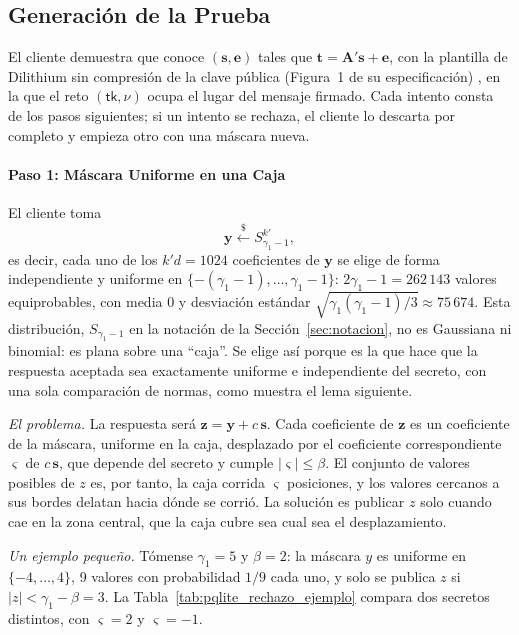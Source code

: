 \subsection{Generación de la Prueba}
\label{sec:pqlite-prueba}

El cliente demuestra que conoce $(\mathbf{s}, \mathbf{e})$ tales que $\mathbf{t} = \mathbf{A}'\mathbf{s} + \mathbf{e}$, con la plantilla de Dilithium sin compresión de la clave pública (Figura~1 de su especificación) \cite{ducas2018crystals, bai2021dilithium}, en la que el reto $(\mathsf{tk}, \nu)$ ocupa el lugar del mensaje firmado. Cada intento consta de los pasos siguientes; si un intento se rechaza, el cliente lo descarta por completo y empieza otro con una máscara nueva.

\paragraph{Paso 1: Máscara Uniforme en una Caja}
\label{sec:pqlite-mascara}
El cliente toma
\begin{equation}
\mathbf{y} \xleftarrow{\$} S_{\gamma_1 - 1}^{k'},
\end{equation}
es decir, cada uno de los $k'd = 1024$ coeficientes de $\mathbf{y}$ se elige de forma independiente y uniforme en $\{-(\gamma_1-1), \dots, \gamma_1-1\}$: $2\gamma_1 - 1 = 262\,143$ valores equiprobables, con media $0$ y desviación estándar $\sqrt{\gamma_1(\gamma_1-1)/3} \approx 75\,674$. Esta distribución, $S_{\gamma_1-1}$ en la notación de la Sección~\ref{sec:notacion}, no es Gaussiana ni binomial: es plana sobre una ``caja''. Se elige así porque es la que hace que la respuesta aceptada sea exactamente uniforme e independiente del secreto, con una sola comparación de normas, como muestra el lema siguiente.

\textit{El problema.} La respuesta será $\mathbf{z} = \mathbf{y} + c\,\mathbf{s}$. Cada coeficiente de $\mathbf{z}$ es un coeficiente de la máscara, uniforme en la caja, desplazado por el coeficiente correspondiente $\varsigma$ de $c\,\mathbf{s}$, que depende del secreto y cumple $|\varsigma| \le \beta$. El conjunto de valores posibles de $z$ es, por tanto, la caja corrida $\varsigma$ posiciones, y los valores cercanos a sus bordes delatan hacia dónde se corrió. La solución es publicar $z$ solo cuando cae en la zona central, que la caja cubre sea cual sea el desplazamiento.

\textit{Un ejemplo pequeño.} Tómense $\gamma_1 = 5$ y $\beta = 2$: la máscara $y$ es uniforme en $\{-4, \dots, 4\}$, 9 valores con probabilidad $1/9$ cada uno, y solo se publica $z$ si $|z| < \gamma_1 - \beta = 3$. La Tabla~\ref{tab:pqlite_rechazo_ejemplo} compara dos secretos distintos, con $\varsigma = 2$ y $\varsigma = -1$.

